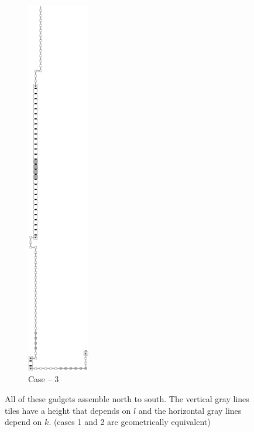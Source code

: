 \begin{figure}[H]
\begin{subfigure}[t]{0.3\textwidth}
\end{subfigure}%
    ~
    \begin{subfigure}[t]{0.3\textwidth}
        \centering
        \includegraphics[width=0.3\textwidth]{return_paths/return_digit3_read_next_row}
        \caption{\label{fig:return_paths/return_digit3_read_next_row} Case -- 3}
    \end{subfigure}%
    \caption{\label{fig:return_path_next_row}
    All of these gadgets assemble north to south. The vertical gray lines tiles have a height
    that depends on $l$ and the horizontal gray lines depend on $k$. (cases 1 and 2 are geometrically equivalent)}
\end{figure}


